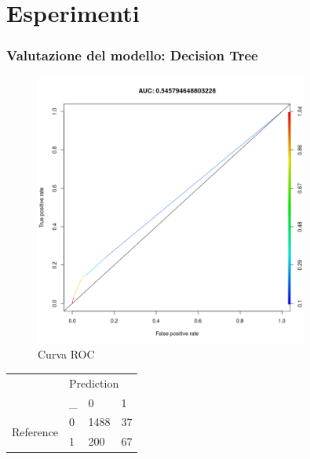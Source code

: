 \section{Esperimenti}

\begin{frame}[fragile]
\frametitle{Valutazione del modello: Decision Tree}
\begin{minipage}{0.45\textwidth}
\begin{figure}
    \centering
    \includegraphics[width=0.8\textwidth]{Img/model evalutation/[D-TREE]ROC.png}
    \caption{Curva ROC}
    \label{fig:RocCurve}
\end{figure}
\end{minipage}%
\hspace{2em}
\begin{minipage}{0.45\textwidth}

\begin{table}[h!]
\centering
\begin{tabular}{|ll|lll|}
\hline
\multicolumn{2}{|l|}{\multirow{2}{*}{}} & \multicolumn{3}{l|}{Prediction}                        \\ \cline{3-5} 
\multicolumn{2}{|l|}{}                  & \multicolumn{1}{c|}{\_} & \multicolumn{1}{l|}{0}  & 1  \\ \hline
\multicolumn{2}{|l|}{\multirow{2}{*}{Reference}} & \multicolumn{1}{l|}{0} & \multicolumn{1}{l|}{1488} & 37 \\ \cline{3-5} 
\multicolumn{2}{|l|}{}                  & \multicolumn{1}{l|}{1} & \multicolumn{1}{l|}{200} & 67 \\ \hline
\end{tabular}
\end{table}


\end{minipage}
\end{frame}
